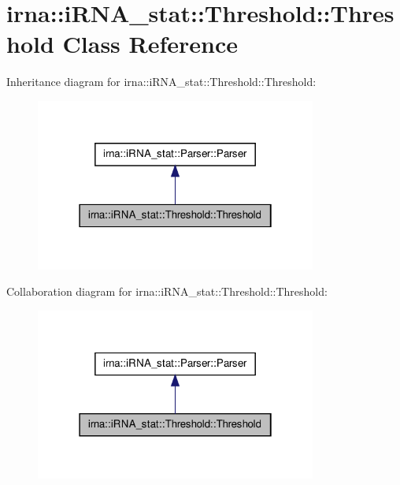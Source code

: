 \hypertarget{classirna_1_1iRNA__stat_1_1Threshold_1_1Threshold}{
\section{irna\-:\-:i\-R\-N\-A\-\_\-stat\-:\-:\-Threshold\-:\-:\-Threshold \-Class \-Reference}
\label{classirna_1_1iRNA__stat_1_1Threshold_1_1Threshold}
}


\-Inheritance diagram for irna\-:\-:i\-R\-N\-A\-\_\-stat\-:\-:\-Threshold\-:\-:\-Threshold\-:\nopagebreak
\begin{figure}[H]
\begin{center}
\leavevmode
\includegraphics[width=262pt]{classirna_1_1iRNA__stat_1_1Threshold_1_1Threshold__inherit__graph}
\end{center}
\end{figure}


\-Collaboration diagram for irna\-:\-:i\-R\-N\-A\-\_\-stat\-:\-:\-Threshold\-:\-:\-Threshold\-:\nopagebreak
\begin{figure}[H]
\begin{center}
\leavevmode
\includegraphics[width=262pt]{classirna_1_1iRNA__stat_1_1Threshold_1_1Threshold__coll__graph}
\end{center}
\end{figure}
